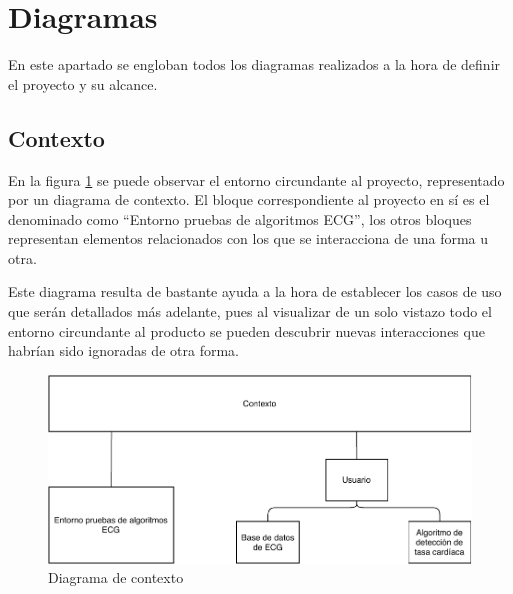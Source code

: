 \minitoc
\clearpage

\section{Diagramas}

En este apartado se engloban todos los diagramas realizados a la hora de definir el proyecto y su alcance.

    \subsection{Contexto}
     
    En la figura \ref{fig:CtxDiagram} se puede observar el entorno circundante al proyecto, representado por un diagrama de contexto. El bloque correspondiente al proyecto en sí es el denominado como “Entorno pruebas de algoritmos ECG”, los otros bloques representan elementos relacionados con los que se interacciona de una forma u otra. 

    Este diagrama resulta de bastante ayuda a la hora de establecer los casos de uso que serán detallados más adelante, pues al visualizar de un solo vistazo todo el entorno circundante al producto se pueden descubrir nuevas interacciones que habrían sido ignoradas de otra forma.        

    \begin{figure}[H]  
        \centering
            \includegraphics[width =\linewidth]{figuras/ContextDiagram.pdf}
        \caption{Diagrama de contexto}
        \label{fig:CtxDiagram}
    \end{figure}

